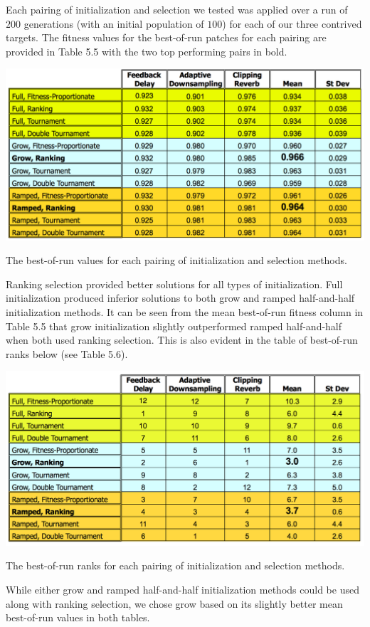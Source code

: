 \documentclass[12pt]{report} 	%
\numberwithin{figure}{chapter}
\numberwithin{table}{chapter}
\numberwithin{equation}{chapter}
\begin{document}
\begin{flushleft}
Each pairing of initialization and selection we tested was applied over a run of $200$ generations (with an initial population of $100$) for each of our three contrived targets. The fitness values for the best-of-run patches for each pairing are provided in Table 5.5 with the two top performing pairs in bold.
\begin{table}[h!]
\begin{center}
\includegraphics[scale=0.6,width=\linewidth]{InitializationTable1}
\caption[Initialization and selection best-of-run values]{The best-of-run values for each pairing of initialization and selection methods.}
\end{center}
\end{table}
Ranking selection provided better solutions for all types of initialization. Full initialization produced inferior solutions to both grow and ramped half-and-half initialization methods. It can be seen from the mean best-of-run fitness column in Table 5.5 that grow initialization slightly outperformed ramped half-and-half when both used ranking selection. This is also evident in the table of best-of-run ranks below (see Table 5.6).
\begin{table}[h!]
\begin{center}
\includegraphics[scale=0.6,width=\linewidth]{InitializationTable2}
\caption[Initialization and selection best-of-run ranks]{The best-of-run ranks for each pairing of initialization and selection methods.}
\end{center}
\end{table}
While either grow and ramped half-and-half initialization methods could be used along with ranking selection, we chose grow based on its slightly better mean best-of-run values in both tables.


\end{flushleft}
\end{document}
